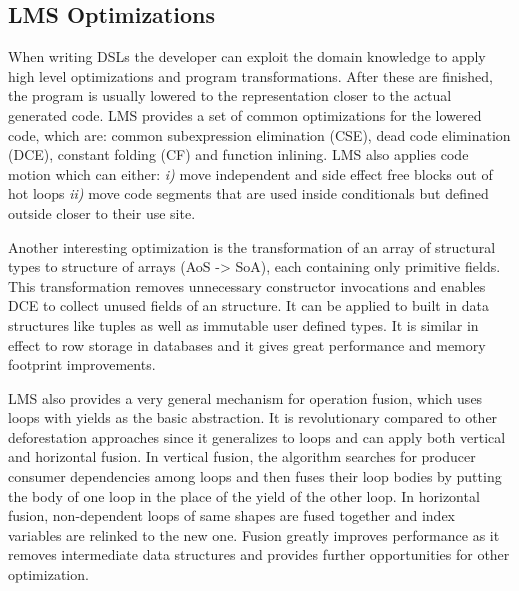 \subsection{LMS Optimizations}
\label{sbusec:lms-optimizations}
When writing DSLs the developer can exploit the domain knowledge to apply high level optimizations and program transformations. After these are finished, the program is usually lowered to the representation closer to the actual generated code. LMS provides a set of common optimizations for the lowered code, which are: common subexpression elimination (CSE), dead code elimination (DCE), constant folding (CF) and function inlining. LMS also applies code motion which can either: \emph{i)} move independent and side effect free blocks out of hot loops \emph{ii)} move code segments that are used inside conditionals but defined outside closer to their use site.   

Another interesting optimization is the transformation of an array of structural types to structure of arrays (AoS -> SoA), each containing only primitive fields. This transformation removes unnecessary constructor invocations and enables DCE to collect unused fields of an structure. It can be applied to built in data structures like tuples as well as immutable user defined types. It is similar in effect to row storage in databases and it gives great performance and memory footprint improvements.

LMS also provides a very general mechanism for operation fusion, which uses loops with yields as the basic abstraction. It is revolutionary compared to other deforestation approaches since it generalizes to loops and can apply both vertical and horizontal fusion. In vertical fusion, the algorithm searches for producer consumer dependencies among loops and then fuses their loop bodies by putting the body of one loop in the place of the yield of the other loop. In horizontal fusion, non-dependent loops of same shapes are fused together and index variables are relinked to the new one. Fusion greatly improves performance as it removes intermediate data structures and provides further opportunities for other optimization.

